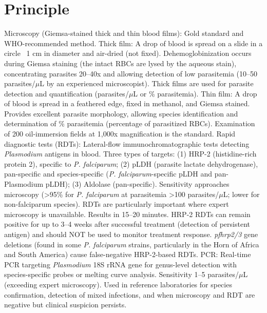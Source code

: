 \section*{Principle}
Microscopy (Giemsa-stained thick and thin blood films): Gold standard and WHO-recommended method. Thick film: A drop of blood is spread on a slide in a circle ~1 cm in diameter and air-dried (not fixed). Dehemoglobinization occurs during Giemsa staining (the intact RBCs are lysed by the aqueous stain), concentrating parasites 20--40x and allowing detection of low parasitemia (10--50 parasites/$\mu$L by an experienced microscopist). Thick films are used for parasite detection and quantification (parasites/$\mu$L or \% parasitemia). Thin film: A drop of blood is spread in a feathered edge, fixed in methanol, and Giemsa stained. Provides excellent parasite morphology, allowing species identification and determination of \% parasitemia (percentage of parasitized RBCs). Examination of 200 oil-immersion fields at 1,000x magnification is the standard. Rapid diagnostic tests (RDTs): Lateral-flow immunochromatographic tests detecting \textit{Plasmodium} antigens in blood. Three types of targets: (1) HRP-2 (histidine-rich protein 2), specific to \textit{P. falciparum}; (2) pLDH (parasite lactate dehydrogenase), pan-specific and species-specific (\textit{P. falciparum}-specific pLDH and pan-Plasmodium pLDH); (3) Aldolase (pan-specific). Sensitivity approaches microscopy (>95\% for \textit{P. falciparum} at parasitemia >100 parasites/$\mu$L; lower for non-falciparum species). RDTs are particularly important where expert microscopy is unavailable. Results in 15--20 minutes. HRP-2 RDTs can remain positive for up to 3--4 weeks after successful treatment (detection of persistent antigen) and should NOT be used to monitor treatment response. \textit{pfhrp2/3} gene deletions (found in some \textit{P. falciparum} strains, particularly in the Horn of Africa and South America) cause false-negative HRP-2-based RDTs. PCR: Real-time PCR targeting \textit{Plasmodium} 18S rRNA gene for genus-level detection with species-specific probes or melting curve analysis. Sensitivity 1--5 parasites/$\mu$L (exceeding expert microscopy). Used in reference laboratories for species confirmation, detection of mixed infections, and when microscopy and RDT are negative but clinical suspicion persists.


